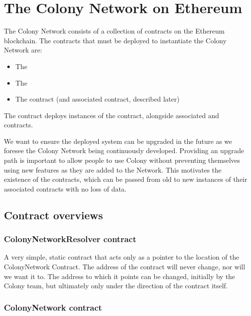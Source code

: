 \section{The Colony Network on Ethereum}\label{sec:colonynetwork}

The Colony Network consists of a collection of contracts on the Ethereum blockchain. The contracts that must be deployed to instantiate the Colony Network are:

\begin{itemize}
\item The 
\item The 
\item The  contract (and associated  contract, described later)
\end{itemize}

The  contract deploys instances of the  contract, alongside associated  and  contracts.

We want to ensure the deployed system can be upgraded in the future as we foresee the Colony Network being continuously developed. Providing an upgrade path is important to allow people to use Colony without preventing themselves using new features as they are added to the Network. This motivates the existence of the  contracts, which can be passed from old to new instances of their associated contracts with no loss of data.

\subsection{Contract overviews}

\subsubsection{ColonyNetworkResolver contract}
A very simple, static contract that acts only as a pointer to the location of the ColonyNetwork Contract. The address of the  contract will never change, nor will we want it to. The address to which it points can be changed, initially by the Colony team, but ultimately only under the direction of the  contract itself.

\subsubsection {ColonyNetwork contract}

